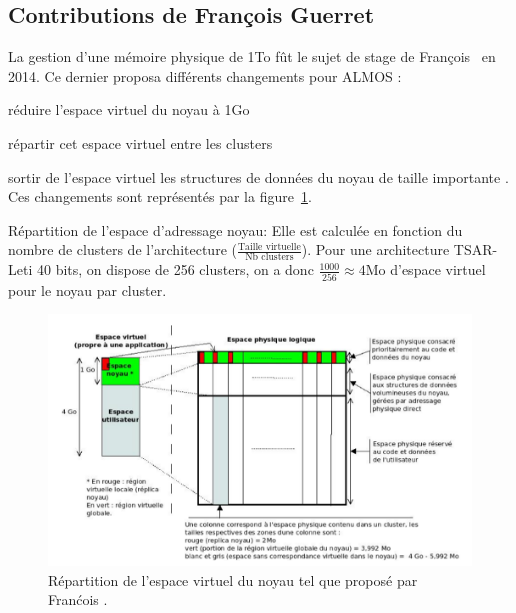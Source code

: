       
    \subsection{Contributions de François Guerret}
      
      La gestion d'une mémoire physique de 1To fût le sujet de stage de
      François~\citet{guerret2014exploitation} en 2014. Ce dernier proposa
      différents changements pour ALMOS : \benumline \item réduire l'espace
      virtuel du noyau à 1Go \item répartir cet espace virtuel entre les
      clusters \item sortir de l'espace virtuel les structures de données du
      noyau de taille importante \eenumline. Ces changements sont représentés
      par la figure~\ref{fig:almos-guerret}.

      \begin{paragraph}{Répartition de l'espace d'adressage noyau:}
        Elle est calculée en fonction du nombre de clusters de l'architecture
        ($\frac{\text{Taille virtuelle}}{\text{Nb clusters}}$). Pour une
        architecture TSAR-Leti 40 bits, on dispose de 256 clusters, on a donc
        $\frac{1000}{256}\approx4$Mo d'espace virtuel pour le noyau par cluster.
      \end{paragraph}

      \begin{figure}[ht]
        \centering \includegraphics[scale=0.8]{include/img/almos-guerret}
        \caption{Répartition de l'espace virtuel du noyau tel que proposé par
          Franćois \citet{guerret2014exploitation}.}
        \label{fig:almos-guerret}
      \end{figure}

